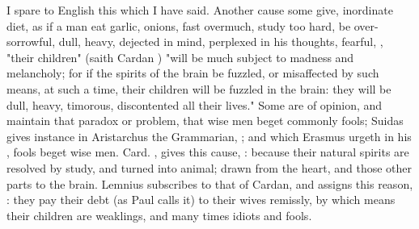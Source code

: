 \etc{} I spare to English this which I have said. Another cause some give,
inordinate diet, as if a man eat garlic, onions, fast overmuch, study too hard,
be over-sorrowful, dull, heavy, dejected in mind, perplexed in his thoughts,
fearful, \etc{}, "their children" (saith Cardan
) "will be much subject to madness and
melancholy; for if the spirits of the brain be fuzzled, or misaffected by such
means, at such a time, their children will be fuzzled in the brain: they will
be dull, heavy, timorous, discontented all their lives." Some are of opinion,
and maintain that paradox or problem, that wise men beget commonly fools;
Suidas gives instance in Aristarchus the Grammarian, ; and which
Erasmus urgeth in his , fools
beget wise men. Card. , gives this cause,
: because their natural spirits are resolved by study, and turned into
animal; drawn from the heart, and those other parts to the brain. Lemnius
subscribes to that of Cardan, and assigns this reason, : they pay their debt (as Paul calls it) to their wives remissly, by
which means their children are weaklings, and many times idiots and fools.

